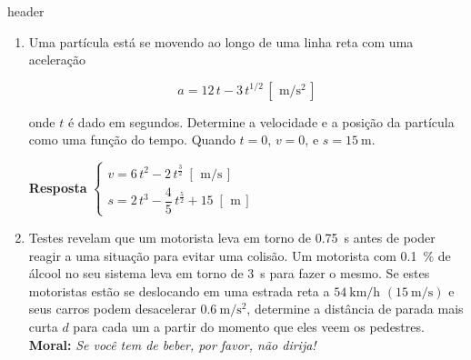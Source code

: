 \documentclass[a4paper,12pt]{article}
\begin{document}
	 {header}
	
	\begin{enumerate}
		\item Uma partícula está se movendo ao longo de uma linha reta com uma aceleração
		
		\begin{equation}
		a=12\,t-3\,t^{1/2}\, [\,\SI{}{\meter/\second^{2}}\,]
		\end{equation}
		
		onde $t$ é dado em segundos. Determine a velocidade e a posição da partícula como uma função
		do tempo. Quando $t=0$, $v=0$, e $s=\SI{15}{\meter}$.
		
		
		\textbf{Resposta}
		$
		\begin{cases}
		v=6\,t^{2}-2\,t^{\frac{3}{2}}\;[\,\SI{}{\meter/\second}\,]\\
		s=2\,t^{3}-\dfrac{4}{5}\,t^{\frac{5}{2}}+15\;[\,\SI{}{\meter}\,]
		\end{cases}
		$
		
		
		\item Testes revelam que um motorista leva em torno de \SI{0.75}{\second} antes de poder reagir a uma
		situação para evitar uma colisão. Um motorista com \SI{0.1}{\percent} de álcool no seu sistema leva em torno de \SI{3}{\second} para fazer o mesmo. Se estes motoristas estão se deslocando em uma estrada reta a $\SI{54}{\kilo\meter/\hour}$ $(\SI{15}{\meter/\second})$ e seus carros podem desacelerar $\SI{0.6}{\meter/\second^{2}}$, determine a distância de parada mais curta $d$ para
		cada um a partir do momento que eles veem os pedestres. \textbf{Moral:} \textit{Se você tem de beber, por favor, não dirija!}
		

\end{enumerate}
\end{document}
